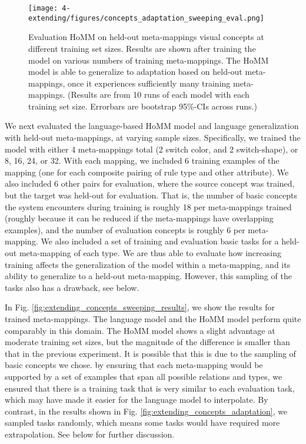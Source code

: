 \begin{figure}[htb]
\centering
\texttt{[image: 4-extending/figures/concepts\_adaptation\_sweeping\_eval.png]}
\caption[Evaluating HoMM on held-out meta-mappings at different training set sizes.]{Evaluation HoMM on held-out meta-mappings visual concepts at different training set sizes. Results are shown after training the model on various numbers of training meta-mappings. The HoMM model is able to generalize to adaptation based on held-out meta-mappings, once it experiences sufficiently many training meta-mappings. (Results are from 10 runs of each model with each training set size. Errorbars are bootstrap 95\%-CIs across runs.)} \label{fig:extending_concepts_sweeping_results_eval}
\end{figure}

We next evaluated the language-based HoMM model and language generalization with held-out meta-mappings, at varying sample sizes. Specifically, we trained the model with either 4 meta-mappings total (2 switch color, and 2 switch-shape), or 8, 16, 24, or 32. With each mapping, we included 6 training examples of the mapping (one for each composite pairing of rule type and other attribute). We also included 6 other pairs for evaluation, where the source concept was trained, but the target was held-out for evaluation. That is, the number of basic concepts the system encounters during training is roughly 18 per meta-mappings trained (roughly because it can be reduced if the meta-mappings have overlapping examples), and the number of evaluation concepts is roughly 6 per meta-mapping. We also included a set of training and evaluation basic tasks for a held-out meta-mapping of each type. We are thus able to evaluate how increasing training affects the generalization of the model within a meta-mapping, and its ability to generalize to a held-out meta-mapping. However, this sampling of the tasks also has a drawback, see below. \par

In Fig. \ref{fig:extending_concepts_sweeping_results}, we show the results for trained meta-mappings. The language model and the HoMM model perform quite comparably in this domain. The HoMM model shows a slight advantage at moderate training set sizes, but the magnitude of the difference is smaller than that in the previous experiment. It is possible that this is due to the sampling of basic concepts we chose. by ensuring that each meta-mapping would be supported by a set of examples that span all possible relations and types, we ensured that there is a training task that is very similar to each evaluation task, which may have made it easier for the language model to interpolate. By contrast, in the results shown in Fig. \ref{fig:extending_concepts_adaptation}, we sampled tasks randomly, which means some tasks would have required more extrapolation. See below for further discussion.\par


